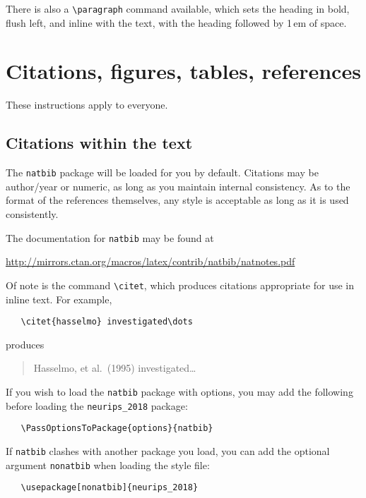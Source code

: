 \documentclass{article}
\begin{document}
There is also a \verb+\paragraph+ command available, which sets the heading in
bold, flush left, and inline with the text, with the heading followed by 1\,em
of space.

\section{Citations, figures, tables, references}
\label{others}

These instructions apply to everyone.

\subsection{Citations within the text}

The \verb+natbib+ package will be loaded for you by default.  Citations may be
author/year or numeric, as long as you maintain internal consistency.  As to the
format of the references themselves, any style is acceptable as long as it is
used consistently.

The documentation for \verb+natbib+ may be found at
\begin{center}
  \url{http://mirrors.ctan.org/macros/latex/contrib/natbib/natnotes.pdf}
\end{center}
Of note is the command \verb+\citet+, which produces citations appropriate for
use in inline text.  For example,
\begin{verbatim}
   \citet{hasselmo} investigated\dots
\end{verbatim}
produces
\begin{quote}
  Hasselmo, et al.\ (1995) investigated\dots
\end{quote}

If you wish to load the \verb+natbib+ package with options, you may add the
following before loading the \verb+neurips_2018+ package:
\begin{verbatim}
   \PassOptionsToPackage{options}{natbib}
\end{verbatim}

If \verb+natbib+ clashes with another package you load, you can add the optional
argument \verb+nonatbib+ when loading the style file:
\begin{verbatim}
   \usepackage[nonatbib]{neurips_2018}
\end{verbatim}
\end{document}
